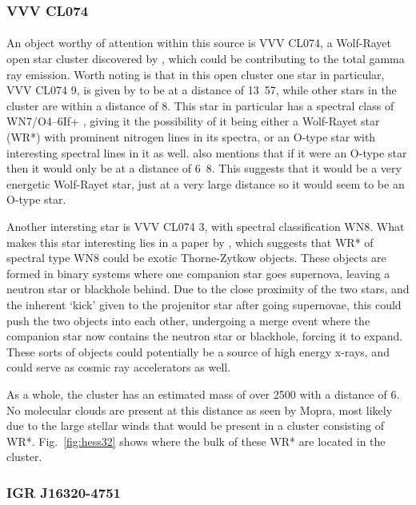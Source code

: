 \documentclass[a4paper, titlepage, oneside]{article}
\newcommand{\smass}{\mathrm{M_\odot}}
\newcommand{\parsec}{\mathrm{pc}}
\begin{document}
\begin{multicols}{2}
\subsubsection{VVV CL074}
\paragraph{}
An object worthy of attention within this source is VVV CL074, a Wolf-Rayet open star cluster discovered by \textcite{Chene:2013}, which could be contributing to the total gamma ray emission. Worth noting is that in this open cluster one star in particular, VVV CL074 9, is given by \textcite{Chene:2013} to be at a distance of \unit{13.57}{\kilo\parsec}, while other stars in the cluster are within a distance of \unit{8}{\kilo\parsec}. This star in particular has a spectral class of WN7/O4–6If+ \parencite{Chene:2013}, giving it the possibility of it being either a Wolf-Rayet star (WR*) with prominent nitrogen lines in its spectra, or an O-type star with interesting spectral lines in it as well. \textcite{Chene:2013} also mentions that if it were an O-type star then it would only be at a distance of \unit{6.8}{\kilo\parsec}. This suggests that it would be a very energetic Wolf-Rayet star, just at a very large distance so it would seem to be an O-type star.

Another intersting star is VVV CL074 3, with spectral classification WN8. What makes this star interesting lies in a paper by \textcite{Foellmi:2002}, which suggests that WR* of spectral type WN8 could be exotic Thorne-Zytkow objects. These objects are formed in binary systems where one companion star goes supernova, leaving a neutron star or blackhole behind. Due to the close proximity of the two stars, and the inherent `kick' given to the projenitor star after going supernovae, this could push the two objects into each other, undergoing a merge event where the companion star now contains the neutron star or blackhole, forcing it to expand. These sorts of objects could potentially be a source of high energy x-rays, and could serve as cosmic ray accelerators as well.

As a whole, the cluster has an estimated mass of over \unit{2500}{\smass} with a distance of \unit{6}{\kilo\parsec}. No molecular clouds are present at this distance as seen by Mopra, most likely due to the large stellar winds that would be present in a cluster consisting of WR*. Fig.~\ref{fig:hess32} shows where the bulk of these WR* are located in the cluster.

\subsubsection{IGR J16320-4751}

\end{multicols}
\end{document}
